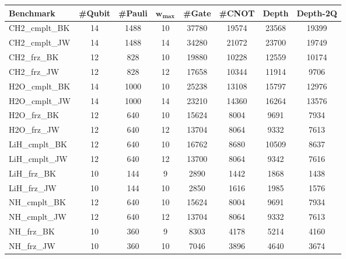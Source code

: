 \begin{tabular}{|l|c|c|c|c|c|c|c|}
    \hline
    {Benchmark} & {\#Qubit} & {\#Pauli} & $\mathbf{w_{\max}}$ & {\#Gate} & {\#CNOT}  & {Depth} & {Depth-2Q} \\
    \hline
    \hline
    CH2\_cmplt\_BK & 14 & 1488 & 10 & 37780 & 19574 & 23568 & 19399 \\
    \hline
    CH2\_cmplt\_JW & 14 & 1488 & 14 & 34280 & 21072 & 23700 & 19749 \\
    \hline
    CH2\_frz\_BK & 12 & 828 & 10 & 19880 & 10228 & 12559 & 10174 \\
    \hline
    CH2\_frz\_JW & 12 & 828 & 12 & 17658 & 10344 & 11914 & 9706 \\
    \hline
    H2O\_cmplt\_BK & 14 & 1000 & 10 & 25238 & 13108 & 15797 & 12976 \\
    \hline
    H2O\_cmplt\_JW & 14 & 1000 & 14 & 23210 & 14360 & 16264 & 13576 \\
    \hline
    H2O\_frz\_BK & 12 & 640 & 10 & 15624 & 8004 & 9691 & 7934 \\
    \hline
    H2O\_frz\_JW & 12 & 640 & 12 & 13704 & 8064 & 9332 & 7613 \\
    \hline
    LiH\_cmplt\_BK & 12 & 640 & 10 & 16762 & 8680 & 10509 & 8637 \\
    \hline
    LiH\_cmplt\_JW & 12 & 640 & 12 & 13700 & 8064 & 9342 & 7616 \\
    \hline
    LiH\_frz\_BK & 10 & 144 & 9 & 2890 & 1442 & 1868 & 1438 \\
    \hline
    LiH\_frz\_JW & 10 & 144 & 10 & 2850 & 1616 & 1985 & 1576 \\
    \hline
    NH\_cmplt\_BK & 12 & 640 & 10 & 15624 & 8004 & 9691 & 7934 \\
    \hline
    NH\_cmplt\_JW & 12 & 640 & 12 & 13704 & 8064 & 9332 & 7613 \\
    \hline
    NH\_frz\_BK & 10 & 360 & 9 & 8303 & 4178 & 5214 & 4160 \\
    \hline
    NH\_frz\_JW & 10 & 360 & 10 & 7046 & 3896 & 4640 & 3674 \\
    \hline
\end{tabular}    